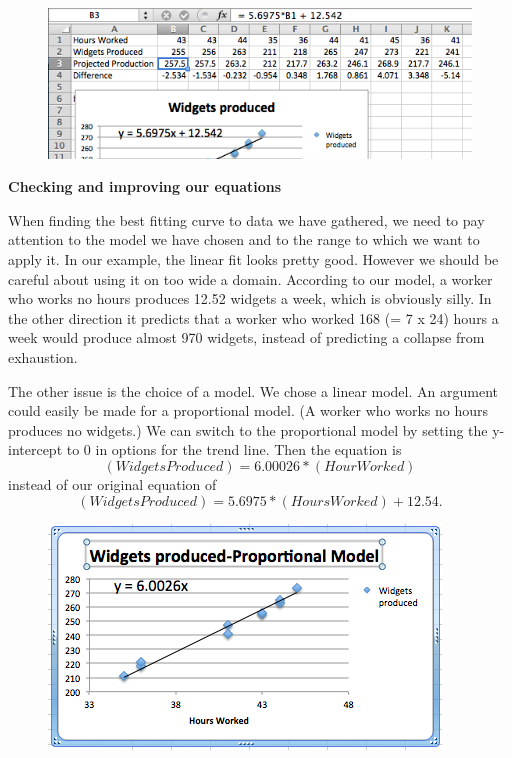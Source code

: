 \documentclass[10pt,]{book}
\newcommand{\terminology}[1]{\textbf{#1}}
\theoremstyle{plain}
\theoremstyle{definition}
\theoremstyle{definition}
\begin{document}
  \leavevmode%
\begin{figure}
\centering
\includegraphics[width=0.8\linewidth]{images/sec1-5-6.png}
\end{figure}
 

%
\par
\terminology{Checking and improving our equations}
%
\par
 When finding the best fitting curve to data we have gathered, we need to pay attention to the model we have chosen and to the range to which we want to apply it.  In our example, the linear fit looks pretty good.  However we should be careful about using it on too wide a domain.  According to our model, a worker who works no hours produces 12.52 widgets a week, which is obviously silly.  In the other direction it predicts that a worker who worked 168 (= 7 x 24) hours a week would produce almost 970 widgets, instead of predicting a collapse from exhaustion.
%
\par
The other issue is the choice of a model.  We chose a linear model.  An argument could easily be made for a proportional model.  (A worker who works no hours produces no widgets.)  We can switch to the proportional model by setting the y-intercept to 0 in options for the trend line.  Then the equation is  
\begin{equation*}(Widgets Produced) = 6.00026*(Hour Worked)\end{equation*}
instead of our original equation of 
\begin{equation*}(Widgets Produced) = 5.6975*(Hours Worked)+12.54.\end{equation*}

  \leavevmode%
\begin{figure}
\centering
\includegraphics[width=0.8\linewidth]{images/sec1-5-7.png}
\end{figure}
 
\end{document}
